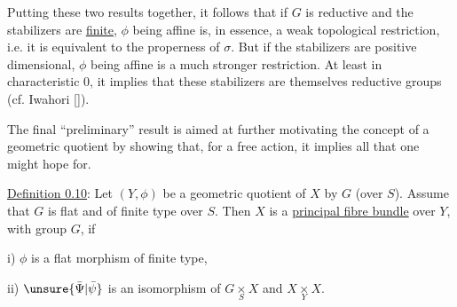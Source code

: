 
Putting these two results together, it follows that if $G$ is reductive and the stabilizers are \uline{finite}, $\phi$ being affine is, in essence, a weak topological restriction, i.e. it is equivalent to the properness of $\sigma$. But if the stabilizers are positive dimensional, $\phi$ being affine is a much stronger restriction. At least in characteristic 0, it implies that these stabilizers are themselves reductive groups (cf. Iwahori [\quad]).

The final ``preliminary'' result is aimed at further motivating the concept of a geometric quotient by showing that, for a free action, it implies all that one might hope for.

\uline{Definition 0.10}: Let $(Y,\phi)$ be a geometric quotient of $X$ by $G$ (over $S$). Assume that $G$ is flat and of finite type over $S$. Then $X$ is a \uline{principal fibre bundle} over $Y$, with group $G$, if

\qquad i) $\phi$ is a flat morphism of finite type,

\qquad ii) $\unsure{\bar\Psi|\bar\psi}$ is an isomorphism of $G\mathbin{\underset{S}{\times}}X$ and $X\mathbin{\underset{Y}{\times}}X$.

